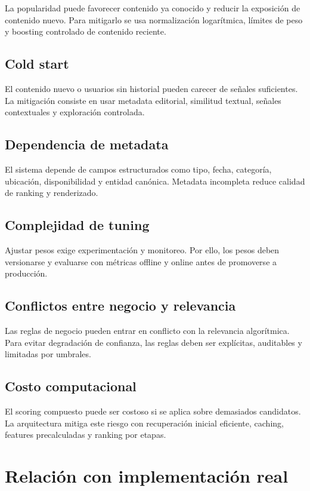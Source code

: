 \documentclass[12pt,a4paper]{article}
\begin{document}
La popularidad puede favorecer contenido ya conocido y reducir la exposición de contenido nuevo. Para mitigarlo se usa normalización logarítmica, límites de peso y boosting controlado de contenido reciente.

\subsection{Cold start}

El contenido nuevo o usuarios sin historial pueden carecer de señales suficientes. La mitigación consiste en usar metadata editorial, similitud textual, señales contextuales y exploración controlada.

\subsection{Dependencia de metadata}

El sistema depende de campos estructurados como tipo, fecha, categoría, ubicación, disponibilidad y entidad canónica. Metadata incompleta reduce calidad de ranking y renderizado.

\subsection{Complejidad de tuning}

Ajustar pesos exige experimentación y monitoreo. Por ello, los pesos deben versionarse y evaluarse con métricas offline y online antes de promoverse a producción.

\subsection{Conflictos entre negocio y relevancia}

Las reglas de negocio pueden entrar en conflicto con la relevancia algorítmica. Para evitar degradación de confianza, las reglas deben ser explícitas, auditables y limitadas por umbrales.

\subsection{Costo computacional}

El scoring compuesto puede ser costoso si se aplica sobre demasiados candidatos. La arquitectura mitiga este riesgo con recuperación inicial eficiente, caching, features precalculadas y ranking por etapas.

\section{Relación con implementación real}
\end{document}
